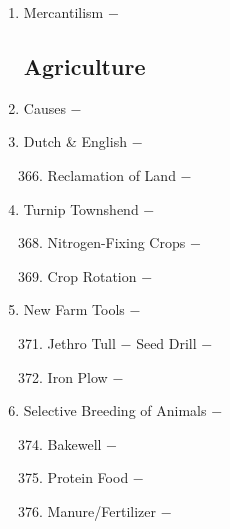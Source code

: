 \documentclass[12pt]{article}
\begin{document}
\begin{enumerate}
\item Mercantilism $-$ 

\subsection{Agriculture}

\item Causes $-$ 

\item Dutch \& English $-$ 
 
\begin{enumerate}[label=\arabic{*}.]
\setcounter{enumii}{365}

\item Reclamation of Land $-$

\end{enumerate}
\setcounter{enumi}{366}

\item Turnip Townshend $-$ 

\begin{enumerate}[label=\arabic{*}.]
\setcounter{enumii}{367}

\item Nitrogen-Fixing Crops $-$

\item Crop Rotation $-$

\end{enumerate}
\setcounter{enumi}{369}

\item New Farm Tools $-$ 

\begin{enumerate}[label=\arabic{*}.]
\setcounter{enumii}{370}

\item Jethro Tull $-$ Seed Drill $-$

\item Iron Plow $-$ 

\end{enumerate}
\setcounter{enumi}{372}

\item Selective Breeding of Animals $-$ 

\begin{enumerate}[label=\arabic{*}.]
\setcounter{enumii}{373}

\item Bakewell $-$

\item Protein Food $-$

\item Manure/Fertilizer $-$ 



\end{enumerate}
\end{enumerate}
\end{document}
